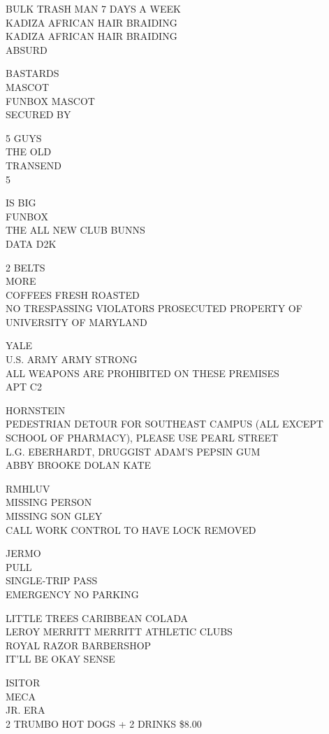 \documentclass[10pt,letterpaper]{article}
\begin{document}
BULK TRASH MAN 7 DAYS A WEEK\\
KADIZA AFRICAN HAIR BRAIDING\\
KADIZA AFRICAN HAIR BRAIDING\\
ABSURD

BASTARDS\\
MASCOT\\
FUNBOX MASCOT\\
SECURED BY

5 GUYS\\
THE OLD\\
TRANSEND\\
5

IS BIG\\
FUNBOX\\
THE ALL NEW CLUB BUNNS\\
DATA D2K

2 BELTS\\
MORE\\
COFFEES FRESH ROASTED\\
NO TRESPASSING VIOLATORS PROSECUTED PROPERTY OF UNIVERSITY OF MARYLAND

YALE\\
U.S. ARMY ARMY STRONG\\
ALL WEAPONS ARE PROHIBITED ON THESE PREMISES\\
APT C2

HORNSTEIN\\
PEDESTRIAN DETOUR FOR SOUTHEAST CAMPUS (ALL EXCEPT SCHOOL OF PHARMACY), PLEASE USE PEARL STREET\\
L.G. EBERHARDT, DRUGGIST ADAM'S PEPSIN GUM\\
ABBY BROOKE DOLAN KATE

RMHLUV\\
MISSING PERSON\\
MISSING SON GLEY\\
CALL WORK CONTROL TO HAVE LOCK REMOVED

JERMO\\
PULL\\
SINGLE{-}TRIP PASS\\
EMERGENCY NO PARKING

LITTLE TREES CARIBBEAN COLADA\\
LEROY MERRITT MERRITT ATHLETIC CLUBS\\
ROYAL RAZOR BARBERSHOP\\
IT'LL BE OKAY SENSE

ISITOR\\
MECA\\
JR. ERA\\
2 TRUMBO HOT DOGS + 2 DRINKS \$8.00
\end{document}
